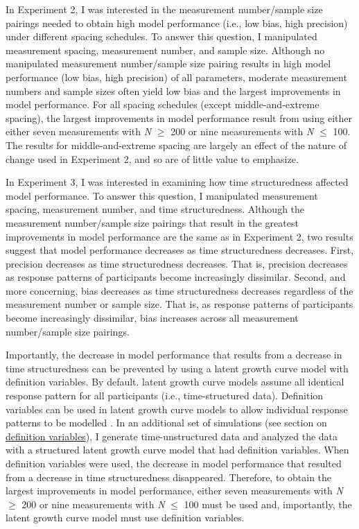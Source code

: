 \documentclass[
12pt, %
twoside,
english]{guelphthesis}
\begin{document}
In Experiment 2, I was interested in the measurement number/sample size pairings needed to obtain high model performance (i.e., low bias, high precision) under different spacing schedules. To answer this question, I manipulated measurement spacing, measurement number, and sample size. Although no manipulated measurement number/sample size pairing results in high model performance (low bias, high precision) of all parameters, moderate measurement numbers and sample sizes often yield low bias and the largest improvements in model performance. For all spacing schedules (except middle-and-extreme spacing), the largest improvements in model performance result from using either either seven measurements with \emph{N} \(\ge\) 200 or nine measurements with \emph{N} \(\le\) 100. The results for middle-and-extreme spacing are largely an effect of the nature of change used in Experiment 2, and so are of little value to emphasize.

In Experiment 3, I was interested in examining how time structuredness affected model performance. To answer this question, I manipulated measurement spacing, measurement number, and time structuredness. Although the measurement number/sample size pairings that result in the greatest improvements in model performance are the same as in Experiment 2, two results suggest that model performance decreases as time structuredness decreases. First, precision decreases as time structuredness decreases. That is, precision decreases as response patterns of participants become increasingly dissimilar. Second, and more concerning, bias decreases as time structuredness decreases regardless of the measurement number or sample size. That is, as response patterns of participants become increasingly dissimilar, bias increases across all measurement number/sample size pairings.

Importantly, the decrease in model performance that results from a decrease in time structuredness can be prevented by using a latent growth curve model with definition variables. By default. latent growth curve models assume all identical response pattern for all participants (i.e., time-structured data). Definition variables can be used in latent growth curve models to allow individual response patterns to be modelled \autocite{metha2000,mehta2005}. In an additional set of simulations (see section on \protect\hyperlink{def-variables}{definition variables}), I generate time-unstructured data and analyzed the data with a structured latent growth curve model that had definition variables. When definition variables were used, the decrease in model performance that resulted from a decrease in time structuredness disappeared. Therefore, to obtain the largest improvements in model performance, either seven measurements with \emph{N} \(\ge\) 200 or nine measurements with \emph{N} \(\le\) 100 must be used and, importantly, the latent growth curve model must use definition variables.
\end{document}
